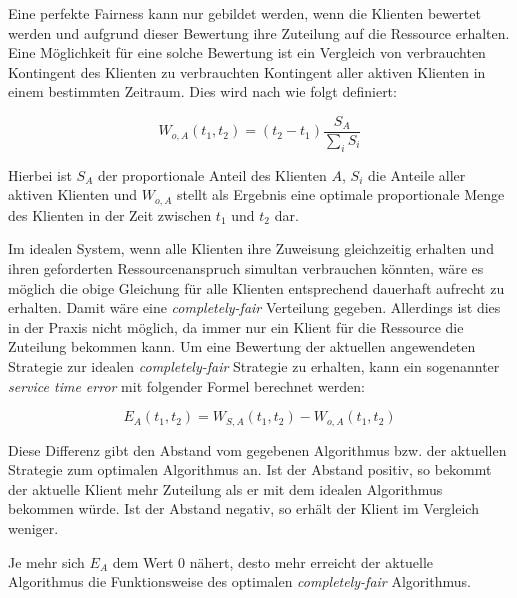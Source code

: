 Eine perfekte Fairness kann nur gebildet werden, wenn die Klienten bewertet werden und aufgrund dieser Bewertung ihre Zuteilung auf die Ressource erhalten.
Eine Möglich\-keit für eine solche Bewertung ist ein Vergleich von verbrauchten Kontingent des Klienten zu verbrauchten Kontingent aller aktiven Klienten in einem bestimmten Zeitraum. 
Dies wird nach \cite{usenix} wie folgt definiert:

\begin{equation}
W_{o,A}(t_1,t_2) = (t_2-t_1) \frac{S_A}{\sum_i S_i}
\label{eq:perfect_fairness}
\end{equation}

Hierbei ist $S_A$ der proportionale Anteil des Klienten $A$, $S_i$ die Anteile aller aktiven Klienten und $W_{o,A}$ stellt als Ergebnis eine optimale proportionale Menge des Klienten in der Zeit zwischen $t_1$ und $t_2$ dar.

Im idealen System, wenn alle Klienten ihre Zuweisung gleichzeitig erhalten und ihren geforderten Ressourcenanspruch simultan verbrauchen könnten, wäre es möglich die obige Gleichung für alle Klienten entsprechend dauerhaft aufrecht zu erhalten.
Damit wäre eine \textit{completely-fair} Verteilung gegeben. Allerdings ist dies in der Praxis nicht möglich, da immer nur ein Klient für die Ressource die Zuteilung bekommen kann.
Um eine Bewertung der aktuellen angewendeten Strategie zur idealen \textit{completely-fair} Strategie zu erhalten, kann ein sogenannter \textit{service time error} mit folgender Formel berechnet werden:

\begin{equation}
E_A(t_1,t_2) = W_{S,A}(t_1,t_2)-W_{o,A}(t_1,t_2)
\label{eq:error_fairness}
\end{equation}

Diese Differenz gibt den Abstand vom gegebenen Algorithmus bzw. der aktuellen Strategie zum optimalen Algorithmus an.
Ist der Abstand positiv, so bekommt der aktuelle Klient mehr Zuteilung als er mit dem idealen Algorithmus bekommen würde. Ist der Abstand negativ, so erhält der Klient im Vergleich weniger.

Je mehr sich $E_A$ dem Wert 0 nähert, desto mehr erreicht der aktuelle Algorithmus die Funktionsweise des optimalen \textit{completely-fair} Algorithmus.
 



